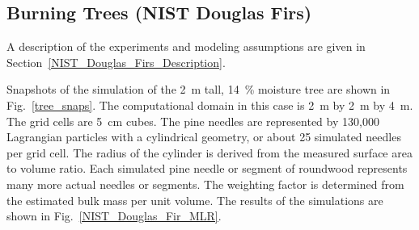 \clearpage

\subsection{Burning Trees (NIST Douglas Firs)}
\label{Douglas_Firs}

A description of the experiments and modeling assumptions are given in Section~\ref{NIST_Douglas_Firs_Description}.

Snapshots of the simulation of the 2~m tall, 14~\% moisture tree are shown in Fig.~\ref{tree_snaps}. The computational domain in this case is 2~m by 2~m by 4~m. The grid cells are 5~cm cubes. The pine needles are represented by 130,000 Lagrangian particles with a cylindrical geometry, or about 25 simulated needles per grid cell. The radius of the cylinder is derived from the measured surface area to volume ratio. Each simulated pine needle or segment of roundwood represents many more actual needles or segments. The weighting factor is determined from the estimated bulk mass per unit volume. The results of the simulations are shown in Fig.~\ref{NIST_Douglas_Fir_MLR}.

